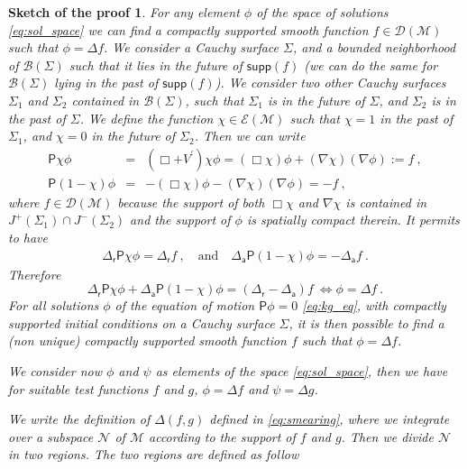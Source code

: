 \documentclass[11pt]{book}
\newcommand{\supp}{\mathsf{supp}}
\newcommand{\Bcal}{\mathcal{B}}
\newcommand{\Dcal}{\mathcal{D}}
\newcommand{\Ecal}{\mathcal{E}}
\newcommand{\Mcal}{\mathcal{M}}
\newcommand{\Ncal}{\mathcal{N}}
\newcommand{\Psf}{\mathsf{P}}
\newcommand{\asf}{\mathsf{a}}
\newcommand{\rsf}{\mathsf{r}}
\theoremstyle{break}
\newtheorem{sketch}{Sketch of the proof}[chapter]
\begin{document}
\begin{sketch}
For any element $\phi$ of the space of solutions \eqref{eq:sol_space} we can find a compactly supported smooth function $f \in \Dcal(\Mcal)$ such that $\phi = \Delta f$. We consider a Cauchy surface $\Sigma$, and a bounded neighborhood of $\Bcal(\Sigma)$ such that it lies in the future of $\supp(f)$ (we can do the same for $\Bcal(\Sigma)$ lying in the past of $\supp(f)$). We consider two other Cauchy surfaces $\Sigma_1$ and $\Sigma_2$ contained in $\Bcal(\Sigma)$, such that $\Sigma_1$ is in the future of $\Sigma$, and $\Sigma_2$ is in the past of $\Sigma$. We define the function $\chi \in \Ecal(\Mcal)$ such that $\chi =1$ in the past of $\Sigma_1$, and $\chi = 0$ in the future of $\Sigma_2$. Then we can write
%
\begin{eqnarray*}
\Psf \chi \phi &=& (\Box + V^\prime) \chi \phi = (\Box \chi) \phi + (\nabla \chi) (\nabla \phi) := f \ , \\
\Psf (1- \chi)\phi &=& - (\Box \chi) \phi - (\nabla \chi) (\nabla \phi) = - f \ , 
\end{eqnarray*}
%
where $f \in \Dcal(\Mcal)$ because the support of both $\Box \chi$ and $\nabla \chi$ is contained in $J^+(\Sigma_1)\cap J^-(\Sigma_2)$ and the support of $\phi$ is spatially compact therein. It permits to have
%
\begin{eqnarray*}
\Delta_\rsf \Psf \chi \phi = \Delta_\rsf f \ , \quad \mbox{and} \quad  \Delta_\asf \Psf (1-\chi) \phi = - \Delta_\asf f \ .
\end{eqnarray*}
%
Therefore
%
\begin{equation*}
\Delta_\rsf \Psf \chi \phi + \Delta_\asf \Psf (1-\chi) \phi = (\Delta_\rsf - \Delta_\asf) f \ \Leftrightarrow \phi = \Delta f \ .
\end{equation*}
%
For all solutions $\phi$ of the equation of motion $\Psf \phi =0$ \eqref{eq:kg_eq}, with compactly supported initial conditions on a Cauchy surface $\Sigma$, it is then possible to find a (non unique) compactly supported smooth function $f$ such that $\phi = \Delta f$.\par%
%
We consider now $\phi$ and $\psi$ as elements of the space \eqref{eq:sol_space}, then we have for suitable test functions $f$ and $g$, $\phi=\Delta f$ and $\psi=\Delta g$.\par%
%
We write the definition of $\Delta(f,g)$ defined in \eqref{eq:smearing}, where we integrate over a subspace $\Ncal$ of $\Mcal$ according to the support of $f$ and $g$. Then we divide $\Ncal$ in two regions. The two regions are defined as follow

\end{sketch}
\end{document}
